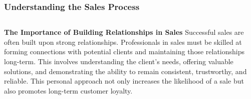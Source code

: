 \documentclass[5pt]{beamer}
\begin{document}
\begin{frame}
\frametitle{Understanding the Sales Process}
\begin{columns}
\begin{column}{0.7\textwidth}
\begin{block}{\textbf{The Importance of Building Relationships in Sales}}
Successful sales are often built upon strong relationships. Professionals in sales must be skilled at forming connections with potential clients and maintaining those relationships long-term. This involves understanding the client's needs, offering valuable solutions, and demonstrating the ability to remain consistent, trustworthy, and reliable. This personal approach not only increases the likelihood of a sale but also promotes long-term customer loyalty.
\end{block}
\end{column}
\end{columns}
\end{frame}
\end{document}
